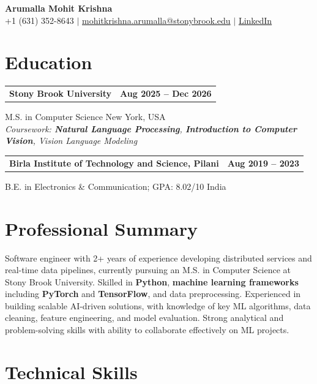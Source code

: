 \documentclass[letterpaper,10pt]{article}
\makeatletter
\newcommand{\entry}[2]{%
  \noindent
  \begin{tabularx}{\linewidth}
    {@{}>{\raggedright\arraybackslash}X@{\hspace{6pt}}r@{}}
    \textbf{#1} & #2
  \end{tabularx}\par
}
\makeatother
\begin{document}
\begin{center}
    {\LARGE\bfseries Arumalla Mohit Krishna}\\[3pt]
    +1 (631) 352-8643 $|$
    \href{mailto:mohitkrishna.arumalla@stonybrook.edu}
    {mohitkrishna.arumalla@stonybrook.edu} $|$
    \href{https://linkedin.com/in/mohit-krishna-arumalla}
    {LinkedIn}
\end{center}
\vspace{-8pt}

\section{Education}

\entry
  {\textbf{Stony Brook University}}
  {\textbf{Aug 2025 -- Dec 2026}}

M.S. in Computer Science \hfill New York, USA\\
\textit{
Coursework: \textbf{Natural Language Processing}, \textbf{Introduction to Computer Vision}, Vision Language Modeling
}
\vspace{3pt}

\entry
  {\textbf{Birla Institute of Technology and Science, Pilani}}
  {\textbf{Aug 2019 -- 2023}}

B.E. in Electronics \& Communication; GPA: 8.02/10 \hfill India

\section{Professional Summary}

Software engineer with 2+ years of experience developing distributed services and real-time data pipelines, currently pursuing an M.S. in Computer Science at Stony Brook University. Skilled in \textbf{Python}, \textbf{machine learning frameworks} including \textbf{PyTorch} and \textbf{TensorFlow}, and data preprocessing. Experienced in building scalable AI-driven solutions, with knowledge of key ML algorithms, data cleaning, feature engineering, and model evaluation. Strong analytical and problem-solving skills with ability to collaborate effectively on ML projects.

\section{Technical Skills}
\end{document}
